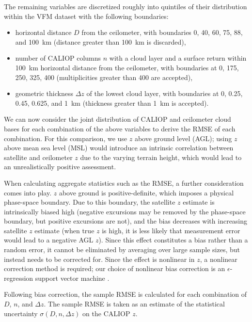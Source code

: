 \documentclass[essd,manuscript]{copernicus}\usepackage[]{graphicx}\usepackage[]{color}
\newcommand\CBH{\ensuremath{z}}
\begin{document}
The remaining variables are discretized roughly into quintiles of their
distribution within the VFM dataset with the
following boundaries:
\begin{itemize}
\item horizontal distance $D$ from the ceilometer, with boundaries 0, 40, 60,
  75, 88, and 100~km (distance greater than 100~km is discarded),
\item number of CALIOP columns $n$ with a cloud layer and a surface return
  within 100~km horizontal distance from the ceilometer, with boundaries at 0,
  175, 250, 325, 400 (multiplicities greater than 400 are accepted),
\item geometric thickness $\Delta z$ of the lowest cloud layer, with boundaries
  at 0, 0.25, 0.45, 0.625, and 1~km (thickness greater than 1~km is accepted).
\end{itemize}

We can now consider the joint distribution of CALIOP and ceilometer cloud bases
for each combination of the above variables to derive the RMSE of each
combination.  For this comparison, we use \CBH{} above ground level (AGL); using
\CBH{} above mean sea level (MSL) would introduce an intrinsic correlation between
satellite and ceilometer \CBH{} due to the varying terrain height, which would lead
to an unrealistically positive assessment.

When calculating aggregate statistics such as the RMSE, a further consideration
comes into play.  \CBH{} above ground is positive-definite, which imposes a
physical phase-space boundary.  Due to this boundary, the satellite \CBH{} estimate
is intrinsically biased high (negative excursions may be removed by the
phase-space boundary, but positive excursions are not), and the bias decreases
with increasing satellite \CBH{} estimate (when true \CBH{} is high, it is less likely
that measurement error would lead to a negative AGL \CBH{}).  Since this effect
constitutes a bias rather than a random error, it cannot be eliminated by
averaging over large sample sizes, but instead needs to be corrected for.  Since
the effect is nonlinear in \CBH{}, a nonlinear correction method is required; our
choice of nonlinear bias correction is an $\epsilon$-regression support vector
machine \citep[SVM,][]{svm}.

Following bias correction, the sample RMSE is calculated for each combination of
$D$, $n$, and $\Delta z$.  The sample RMSE is taken as an estimate of the
statistical uncertainty $\sigma(D,n,\Delta z)$ on the CALIOP \CBH{}.
\end{document}
